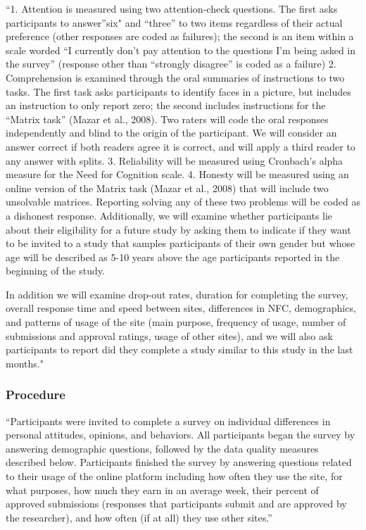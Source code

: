\documentclass[
]{article}
\begin{document}
``1. Attention is measured using two attention-check questions. The
first asks participants to answer''six" and ``three'' to two items
regardless of their actual preference (other responses are coded as
failures); the second is an item within a scale worded ``I currently
don't pay attention to the questions I'm being asked in the survey''
(response other than ``strongly disagree'' is coded as a failure) 2.
Comprehension is examined through the oral summaries of instructions to
two tasks. The first task asks participants to identify faces in a
picture, but includes an instruction to only report zero; the second
includes instructions for the ``Matrix task'' (Mazar et al., 2008). Two
raters will code the oral responses independently and blind to the
origin of the participant. We will consider an answer correct if both
readers agree it is correct, and will apply a third reader to any answer
with splits. 3. Reliability will be measured using Cronbach's alpha
measure for the Need for Cognition scale. 4. Honesty will be measured
using an online version of the Matrix task (Mazar et al., 2008) that
will include two unsolvable matrices. Reporting solving any of these two
problems will be coded as a dishonest response. Additionally, we will
examine whether participants lie about their eligibility for a future
study by asking them to indicate if they want to be invited to a study
that samples participants of their own gender but whose age will be
described as 5-10 years above the age participants reported in the
beginning of the study.

In addition we will examine drop-out rates, duration for completing the
survey, overall response time and speed between sites, differences in
NFC, demographics, and patterns of usage of the site (main purpose,
frequency of usage, number of submissions and approval ratings, usage of
other sites), and we will also ask participants to report did they
complete a study similar to this study in the last months."

\hypertarget{procedure}{%
\subsubsection{Procedure}\label{procedure}}

``Participants were invited to complete a survey on individual
differences in personal attitudes, opinions, and behaviors. All
participants began the survey by answering demographic questions,
followed by the data quality measures described below. Participants
finished the survey by answering questions related to their usage of the
online platform including how often they use the site, for what
purposes, how much they earn in an average week, their percent of
approved submissions (responses that participants submit and are
approved by the researcher), and how often (if at all) they use other
sites.''
\end{document}
